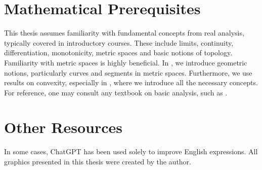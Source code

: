 \documentclass[12pt,a4paper,twoside]{report}
\begin{document}
\pagestyle{empty}



\tableofcontents

\printunsrtglossaries

\section*{Mathematical Prerequisites} \label{sec-math-prereqs}
This thesis assumes familiarity with fundamental concepts from real analysis, typically covered in introductory courses. These include limits, continuity, differentiation, monotonicity, metric spaces and basic notions of topology. Familiarity with metric spaces is highly beneficial.
In , we introduce geometric notions, particularly curves and segments in metric spaces. Furthermore, we use results on convexity, especially in , where we introduce all the necessary concepts.
For reference, one may consult any textbook on basic analysis, such as \textcite{elementaryAna}.

\section*{Other Resources}
In some cases, ChatGPT has been used solely to improve English expressions.
All graphics presented in this thesis were created by the author.

\pagestyle{headings}
























% 





%

\printbibliography
\printindex
\pagebreak

% 

\end{document}
